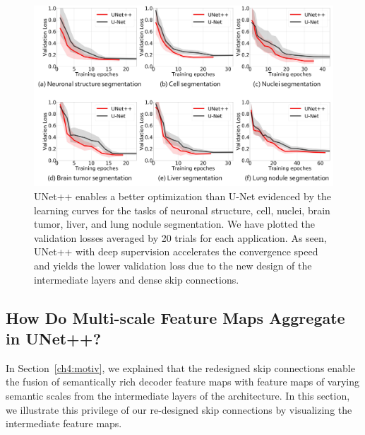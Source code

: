 \begin{figure}[t]
\begin{center}
\includegraphics[width=1.0\linewidth]{Figures/CH4/fig_learning_curves.pdf}
\end{center}
\caption[UNet++ Enables a Better Optimization than U-Net]{
UNet++ enables a better optimization than U-Net evidenced by the learning curves for the tasks of neuronal structure, cell, nuclei, brain tumor, liver, and lung nodule segmentation. We have plotted the validation losses averaged by 20 trials for each application. As seen, UNet++ with deep supervision accelerates the convergence speed and yields the lower validation loss due to the new design of the intermediate layers and dense skip connections.}
\label{ch4:fig:learning_curves}
\end{figure}



\subsection{How Do Multi-scale Feature Maps Aggregate in UNet++?}
\label{ch4:discussion_conclusion:feature_maps_visualization}

In Section~\ref{ch4:motiv}, we explained that the redesigned skip connections enable the fusion of semantically rich decoder feature maps with feature maps of varying semantic scales from the intermediate layers of the architecture. In this section, we illustrate this privilege of our re-designed skip connections by visualizing the intermediate feature maps.

